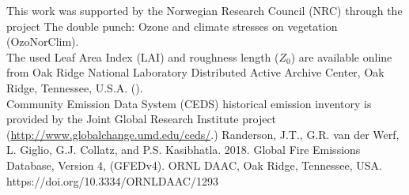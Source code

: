 \documentclass[gmd, manuscript]{copernicus}
\begin{document}



\begin{acknowledgements}
  This work was supported by the Norwegian Research Council (NRC) through the project The double punch: Ozone and climate stresses on vegetation (OzoNorClim).\\
  The used Leaf Area Index (LAI) and roughness length ($Z_0$) are available online from Oak Ridge National Laboratory Distributed Active Archive Center, Oak Ridge, Tennessee, U.S.A. ().\\
  Community Emission Data System (CEDS) historical emission inventory is provided by the Joint Global Research Institute project (\url{http://www.globalchange.umd.edu/ceds/}.)
  Randerson, J.T., G.R. van der Werf, L. Giglio, G.J. Collatz, and P.S. Kasibhatla. 2018. Global Fire Emissions Database, Version 4, (GFEDv4). ORNL DAAC, Oak Ridge, Tennessee, USA. https://doi.org/10.3334/ORNLDAAC/1293
\end{acknowledgements}










\end{document}
